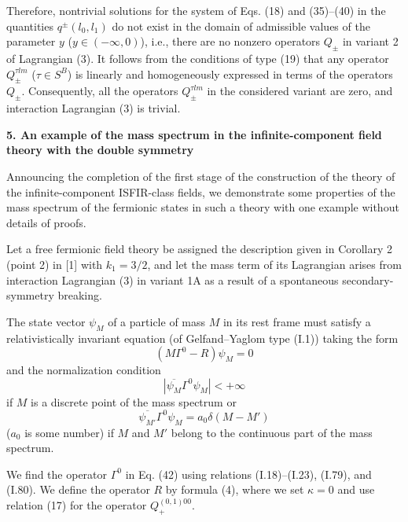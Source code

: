 \documentclass[a4paper,12pt]{article}
\begin{document}
Therefore, nontrivial solutions for the system of Eqs. (18) and (35)--(40) in
the quantities $q^{\pm}(l_{0},l_{1})$ do not exist in the domain of admissible
values of the parameter $y$ ($y \in (-\infty, 0)$), i.e., there are no nonzero
operators $Q_{\pm}$ in variant 2 of Lagrangian (3). It follows from the
conditions of type (19) that any operator $Q^{\tau lm}_{\pm}$ ($\tau \in 
S^{B}$) is linearly and homogeneously expressed in terms of the operators
$Q_{\pm}$. Consequently, all the operators $Q^{\tau lm}_{\pm}$ in the considered
variant are zero, and interaction Lagrangian (3) is trivial.

\begin{center}
{\large \bf 5. An example of the mass spectrum in the infinite-component field
theory with the double symmetry}
\end{center}

Announcing the completion of the first stage of the construction of the theory
of the infinite-component ISFIR-class fields, we demonstrate some properties of
the mass spectrum of the fermionic states in such a theory with one example
without details of proofs.

Let a free fermionic field theory be assigned the description given in
Corollary 2 (point 2) in [1] with $k_{1}=3/2$, and let the mass term of its
Lagrangian arises from interaction Lagrangian (3) in variant 1A as a result of a
spontaneous secondary-symmetry breaking.

The state vector $\psi_{M}$ of a particle of mass $M$ in its rest frame must
satisfy a relativistically invariant equation (of Gelfand--Yaglom type (I.1))
taking the form
\begin{equation}
(M \Gamma^{0} - R)\psi_{M} = 0
\end{equation}
and the normalization condition
\begin{equation}
|\overline{\psi_{M}} \Gamma^{0} \psi_{M}| < +\infty
\end{equation}
if $M$ is a discrete point of the mass spectrum or
\begin{equation}
\overline{\psi_{M'}} \Gamma^{0} \psi_{M} = a_{0}\delta (M-M')
\end{equation}
($a_{0}$ is some number) if $M$ and $M'$ belong to the continuous part of the
mass spectrum.

We find the operator $\Gamma^{0}$ in Eq. (42) using relations (I.18)--(I.23),
(I.79), and (I.80). We define the operator $R$ by formula (4), where we set
$\kappa = 0$ and use relation (17) for the operator $Q^{(0,1)00}_{+}$. 
\end{document}
